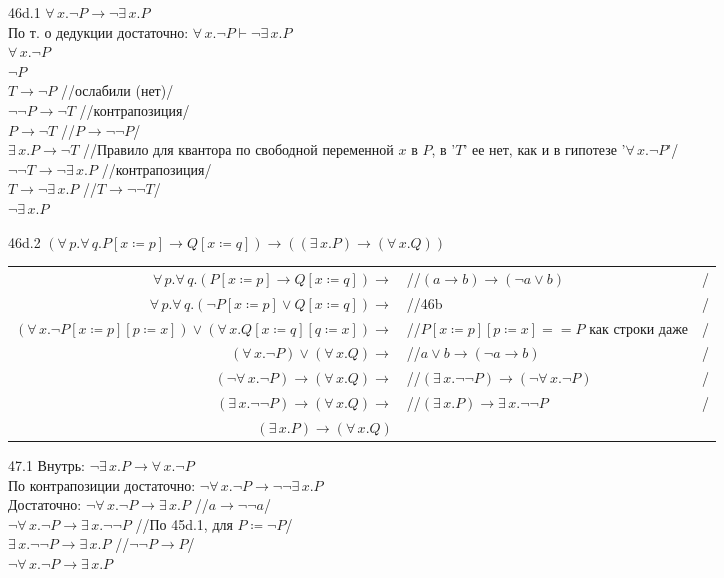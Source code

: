 \documentclass[12pt]{article}
\begin{document}
\bigskip

46d.1 $\forall\,x.\neg P\to\neg\exists\,x.P$\\
По т. о дедукции достаточно: $\forall\,x.\neg P\vdash\neg\exists\,x.P$\\
$\forall\,x.\neg P$\\
$\neg P$\\
$T\to \neg P$ //ослабили (нет)/\\
$\neg\neg P\to\neg T$ //контрапозиция/\\
$P\to\neg T$ //$P\to\neg\neg P$/\\
$\exists\,x.P\to\neg T$ //Правило для квантора по свободной переменной $x$ в $P$, в '$T$' ее нет, как и в гипотезе '$\forall\,x.\neg P$'/\\
$\neg\neg T\to\neg\exists\,x.P$ //контрапозиция/\\
$T\to\neg\exists\,x.P$ //$T\to\neg\neg T$/\\
$\neg\exists\,x.P$

\bigskip

46d.2 $(\forall\,p.\forall\,q.P[x\coloneqq p]\to Q[x\coloneqq q])\to((\exists\,x.P)\to(\forall\,x.Q))$\\
\begin{tabular*}{\textwidth}{r l l}
	$\forall\,p.\forall\,q.(P[x\coloneqq p]\to Q[x\coloneqq q])\to$&//$(a\to b)\to(\neg a\vee b)$&/\\
	$\forall\,p.\forall\,q.(\neg P[x\coloneqq p]\vee Q[x\coloneqq q])\to$&//46b&/\\
	$(\forall\,x.\neg P[x\coloneq p][p\coloneqq x])\vee(\forall\,x.Q[x\coloneq q][q\coloneqq x])\to$&//$P[x\coloneqq p][p\coloneqq x]==P$ как строки даже&/\\
	$(\forall\,x.\neg P)\vee(\forall\,x.Q)\to$&//$a\vee b\to (\neg a\to b)$&/\\
	$(\neg\forall\,x.\neg P)\to(\forall\,x.Q)\to$&//$(\exists\,x.\neg\neg P)\to(\neg\forall\,x.\neg P)$&/\\
	$(\exists\,x.\neg\neg P)\to(\forall\,x.Q)\to$&//$(\exists\,x.P)\to\exists\,x.\neg\neg P$&/\\
	$(\exists\,x.P)\to(\forall\,x.Q)$
\end{tabular*}

\bigskip

47.1 Внутрь: $\neg\exists\,x.P\to\forall\,x.\neg P$\\
По контрапозиции достаточно: $\neg\forall\,x.\neg P\to\neg\neg\exists\,x.P$\\
Достаточно: $\neg\forall\,x.\neg P\to\exists\,x.P$ //$a\to\neg\neg a$/\\
$\neg\forall\,x.\neg P\to\exists\,x.\neg\neg P$ //По 45d.1, для $P\coloneqq\neg P$/\\
$\exists\,x.\neg\neg P\to\exists\,x.P$ //$\neg\neg P\to P$/\\
$\neg\forall\,x.\neg P\to\exists\,x.P$
\end{document}
